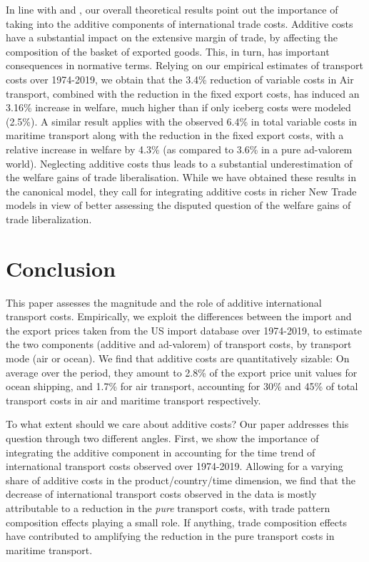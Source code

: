 \documentclass[a4paper,11pt]{article}
\begin{document}
In line with \cite{sorensen2014} and \cite{Irrazabal_2015}, our overall theoretical results point out the importance of taking into the additive components of international trade costs. Additive costs have a substantial impact on the extensive margin of trade, by affecting the composition of the basket of exported goods. This, in turn, has important consequences in normative terms. Relying on our empirical estimates of transport costs over 1974-2019, we obtain that the 3.4\% reduction of variable costs in Air transport, combined with the reduction in the fixed export costs, has induced an 3.16\% increase in welfare, much higher than if only iceberg costs were modeled (2.5\%). A similar result applies with the observed 6.4\% in total variable costs in maritime transport along with the reduction in the fixed export costs, with a relative increase in welfare by 4.3\% (as compared to 3.6\% in a pure ad-valorem world). Neglecting additive costs thus leads to a substantial underestimation of the welfare gains of trade liberalisation. While we have obtained these results in the canonical \cite{melitz} model, they call for integrating additive costs in richer New Trade models in view of better assessing the disputed question of the welfare gains of trade liberalization.




\section{Conclusion \label{sec:conclu}}

This paper assesses the magnitude and the role of additive international transport costs. Empirically, we exploit the differences between the import and the export prices taken from the US import database over 1974-2019, to estimate the two components (additive and ad-valorem) of transport costs, by transport mode (air or ocean). We find that additive costs are quantitatively sizable: On average over the period, they amount to 2.8\% of the export price unit values for ocean shipping, and 1.7\% for air transport, accounting for 30\% and 45\% of total transport costs in air and maritime transport respectively.

To what extent should we care about additive costs? Our paper addresses this question through two different angles. First, we show the importance of integrating the additive component in accounting for the time trend of international transport costs observed over 1974-2019. Allowing for a varying share of additive costs in the product/country/time dimension, we find that the decrease of international transport costs observed in the data is mostly attributable to a reduction in the \textit{pure} transport costs, with trade pattern composition effects playing a small role. If anything, trade composition effects have contributed to amplifying the reduction in the pure transport costs in maritime transport.
\end{document}
